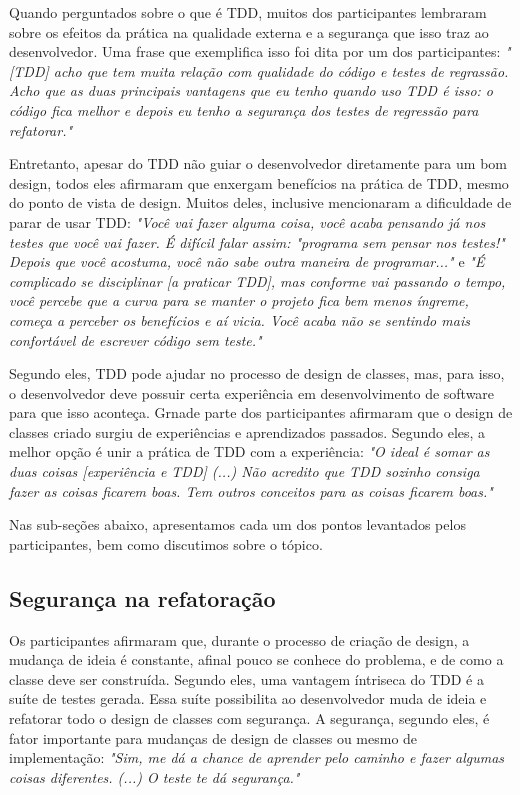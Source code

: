 Quando perguntados sobre o que é TDD, muitos dos participantes lembraram sobre
os efeitos da prática na qualidade externa e a segurança que isso traz
ao desenvolvedor.
Uma frase que exemplifica isso foi dita por um dos participantes:
\textit{"[TDD] acho que tem muita relação com qualidade do código e testes 
de regrassão. Acho que as duas principais vantagens que eu tenho quando uso TDD é isso: o código
fica melhor e depois eu tenho a segurança dos testes de regressão para refatorar."}

Entretanto, apesar do TDD não guiar o desenvolvedor diretamente para um bom design,
todos eles afirmaram que enxergam benefícios na prática de TDD, mesmo do
ponto de vista de design. Muitos deles, inclusive mencionaram a dificuldade
de parar de usar TDD:
\textit{"Você vai fazer alguma coisa, você acaba pensando já nos testes que você vai fazer. É difícil 
falar assim: "programa sem pensar nos testes!" Depois que você acostuma, você não sabe outra
maneira de programar..."} e \textit{"É complicado se disciplinar [a praticar TDD], mas conforme vai passando o tempo, 
você percebe que a curva para se manter o projeto fica bem menos íngreme, 
começa a perceber os benefícios e aí vicia. Você acaba não se sentindo
mais confortável de escrever código sem teste."}

Segundo eles, TDD pode ajudar no processo de design de classes, mas, para isso,
o desenvolvedor deve possuir certa experiência em desenvolvimento de software
para que isso aconteça. Grnade parte dos participantes afirmaram que o 
design de classes criado surgiu de experiências e aprendizados passados.
Segundo eles, a melhor opção é unir a prática de TDD com a experiência:
\textit{"O ideal é somar as duas coisas [experiência e TDD] (...) 
Não acredito que TDD sozinho consiga fazer as coisas ficarem boas. Tem outros conceitos
para as coisas ficarem boas."}

Nas sub-seções abaixo, apresentamos cada um dos pontos 
levantados pelos participantes, bem como discutimos sobre o tópico.

\subsection{Segurança na refatoração}

Os participantes afirmaram que, durante o processo de criação de design, a mudança de ideia é
constante, afinal pouco se conhece do problema, e de como a classe deve ser construída. Segundo eles,
uma vantagem íntriseca do TDD é a suíte de testes gerada. Essa suíte possibilita ao desenvolvedor
muda de ideia e refatorar todo o design de classes com segurança.
A segurança, segundo eles, é fator importante para mudanças de design de classes ou mesmo de implementação:
\textit{"Sim, me dá a chance de aprender pelo caminho e fazer algumas coisas diferentes. (...) O teste te dá segurança."}

